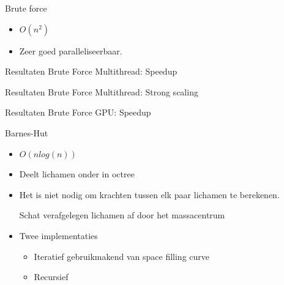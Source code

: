 \documentclass{beamer}
\begin{document}
	\begin{frame}{Brute force}
		\begin{itemize}
			\item $O(n^2)$
			\item Zeer goed paralleliseerbaar.
		\end{itemize}
		\codeBF
		
	\end{frame}
	
	\begin{frame}{Resultaten Brute Force Multithread: Speedup}
		\begin{center}
			\resizebox{!}{.7\paperheight}{}
		\end{center}
	\end{frame}

	
	\begin{frame}{Resultaten Brute Force Multithread: Strong scaling}
		\begin{center}
			\resizebox{!}{.7\paperheight}{}
		\end{center}
	\end{frame}
	
	\begin{frame}{Resultaten Brute Force GPU: Speedup}
		\begin{center}
			\resizebox{!}{.7\paperheight}{}
		\end{center}
	\end{frame}


	\begin{frame}{Barnes-Hut}
		\note{
			
		}
		\begin{itemize}
			\item $O(n log(n))$
			\item Deelt lichamen onder in octree
			\item Het is niet nodig om krachten tussen elk paar lichamen te berekenen.
			
			 Schat verafgelegen lichamen af door het massacentrum
			
			\item Twee implementaties
			\begin{itemize}
				\item Iteratief gebruikmakend van space filling curve
				\item Recursief
			\end{itemize}
		\end{itemize}
		\codeBH
	\end{frame}
	
\end{document}
